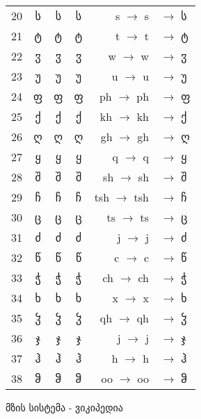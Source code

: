 \documentclass{article}
\newcommand\tgeoi[1]{{\geofontipa #1}}
\newcommand\tgeoii[1]{{\geofontiso #1}}
\newcommand\tgeoiii[1]{{\geofontpkb #1}}
\newcommand\textgeo[1]{{\geofont #1}}
\newcommand\textgeom[1]{{\geomfont #1}}
\begin{document}
\begin{tabular}{rcccrl}
20 & \textgeo{ს}  & \tgeoi{ს} & \tgeoii{ს} & s $\to$ \textgeom{s} &  $\to$ \tgeoiii{ს} \\
21 & \textgeo{ტ}  & \tgeoi{ტ} & \tgeoii{ტ} & t $\to$ \textgeom{t} &  $\to$ \tgeoiii{ტ} \\
22 & \textgeo{ჳ}  & \tgeoi{ჳ} & \tgeoii{ჳ} & w $\to$ \textgeom{w} &  $\to$ \tgeoiii{ჳ} \\
23 & \textgeo{უ}  & \tgeoi{უ} & \tgeoii{უ} & u $\to$ \textgeom{u} &  $\to$ \tgeoiii{უ} \\
24 & \textgeo{ფ}  & \tgeoi{ფ} & \tgeoii{ფ} & ph $\to$ \textgeom{ph} &  $\to$ \tgeoiii{ფ} \\
25 & \textgeo{ქ}  & \tgeoi{ქ} & \tgeoii{ქ} & kh $\to$ \textgeom{kh} &  $\to$ \tgeoiii{ქ} \\
26 & \textgeo{ღ}  & \tgeoi{ღ} & \tgeoii{ღ} & gh $\to$ \textgeom{gh} &  $\to$ \tgeoiii{ღ} \\
27 & \textgeo{ყ}  & \tgeoi{ყ} & \tgeoii{ყ} & q $\to$ \textgeom{q} &  $\to$ \tgeoiii{ყ} \\
28 & \textgeo{შ}  & \tgeoi{შ} & \tgeoii{შ} & sh $\to$ \textgeom{sh} &  $\to$ \tgeoiii{შ} \\
29 & \textgeo{ჩ}  & \tgeoi{ჩ} & \tgeoii{ჩ} & tsh $\to$ \textgeom{tsh} &  $\to$ \tgeoiii{ჩ} \\
30 & \textgeo{ც}  & \tgeoi{ც} & \tgeoii{ც} & ts $\to$ \textgeom{ts} &  $\to$ \tgeoiii{ც} \\
31 & \textgeo{ძ}  & \tgeoi{ძ} & \tgeoii{ძ} & j $\to$ \textgeom{j} &  $\to$ \tgeoiii{ძ} \\
32 & \textgeo{წ}  & \tgeoi{წ} & \tgeoii{წ} & c $\to$ \textgeom{c} &  $\to$ \tgeoiii{წ} \\
33 & \textgeo{ჭ}  & \tgeoi{ჭ} & \tgeoii{ჭ} & ch $\to$ \textgeom{ch} &  $\to$ \tgeoiii{ჭ} \\
34 & \textgeo{ხ}  & \tgeoi{ხ} & \tgeoii{ხ} & x $\to$ \textgeom{x} &  $\to$ \tgeoiii{ხ} \\
35 & \textgeo{ჴ}  & \tgeoi{ჴ} & \tgeoii{ჴ} & qh $\to$ \textgeom{qh} &  $\to$ \tgeoiii{ჴ} \\
36 & \textgeo{ჯ}  & \tgeoi{ჯ} & \tgeoii{ჯ} & j $\to$ \textgeom{j} &  $\to$ \tgeoiii{ჯ} \\
37 & \textgeo{ჰ}  & \tgeoi{ჰ} & \tgeoii{ჰ} & h $\to$ \textgeom{h} &  $\to$ \tgeoiii{ჰ} \\
38 & \textgeo{ჵ}  & \tgeoi{ჵ} & \tgeoii{ჵ} & oo $\to$ \textgeom{oo} &  $\to$ \tgeoiii{ჵ} \\
\end{tabular}

\newpage
\uccon
მზის სისტემა - ვიკიპედია
\uccoff
\end{document}

